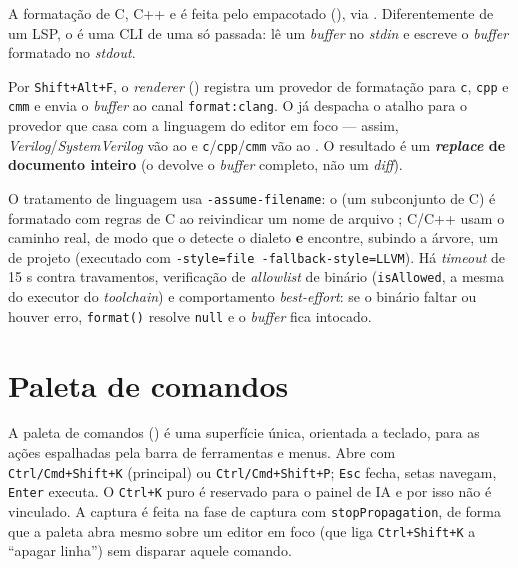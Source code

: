 A formatação de C, C++ e \cmm{} é feita pelo  empacotado
(), via
. Diferentemente de um LSP, o
 é uma CLI de uma só passada: lê um \textit{buffer} no
\textit{stdin} e escreve o \textit{buffer} formatado no \textit{stdout}.

Por \lstinline|Shift+Alt+F|, o \textit{renderer}
() registra um provedor de
formatação para \lstinline|c|, \lstinline|cpp| e \lstinline|cmm| e envia o
\textit{buffer} ao canal \lstinline|format:clang|. O  já despacha o
atalho para o provedor que casa com a linguagem do editor em foco — assim,
\textit{Verilog}/\textit{SystemVerilog} vão ao  e
\lstinline|c|/\lstinline|cpp|/\lstinline|cmm| vão ao . O
resultado é um \textbf{\textit{replace} de documento inteiro} (o
 devolve o \textit{buffer} completo, não um \textit{diff}).

O tratamento de linguagem usa \lstinline|-assume-filename|: o \cmm{} (um
subconjunto de C) é formatado com regras de C ao reivindicar um nome de arquivo
; C/C++ usam o caminho real, de modo que o  detecte o
dialeto \textbf{e} encontre, subindo a árvore, um  de
projeto (executado com \lstinline|-style=file -fallback-style=LLVM|). Há
\textit{timeout} de 15 s contra travamentos, verificação de \textit{allowlist}
de binário (\lstinline|isAllowed|, a mesma do executor do \textit{toolchain}) e
comportamento \textit{best-effort}: se o binário faltar ou houver erro,
\lstinline|format()| resolve \lstinline|null| e o \textit{buffer} fica
intocado.

\section{Paleta de comandos}
\label{sec:13-paleta}

A paleta de comandos () é uma superfície única,
orientada a teclado, para as ações espalhadas pela barra de ferramentas e
menus. Abre com \lstinline|Ctrl/Cmd+Shift+K| (principal) ou
\lstinline|Ctrl/Cmd+Shift+P|; \lstinline|Esc| fecha, setas navegam,
\lstinline|Enter| executa. O \lstinline|Ctrl+K| puro é reservado para o painel
de IA e por isso não é vinculado. A captura é feita na fase de captura com
\lstinline|stopPropagation|, de forma que a paleta abra mesmo sobre um editor
 em foco (que liga \lstinline|Ctrl+Shift+K| a \enquote{apagar
linha}) sem disparar aquele comando.


